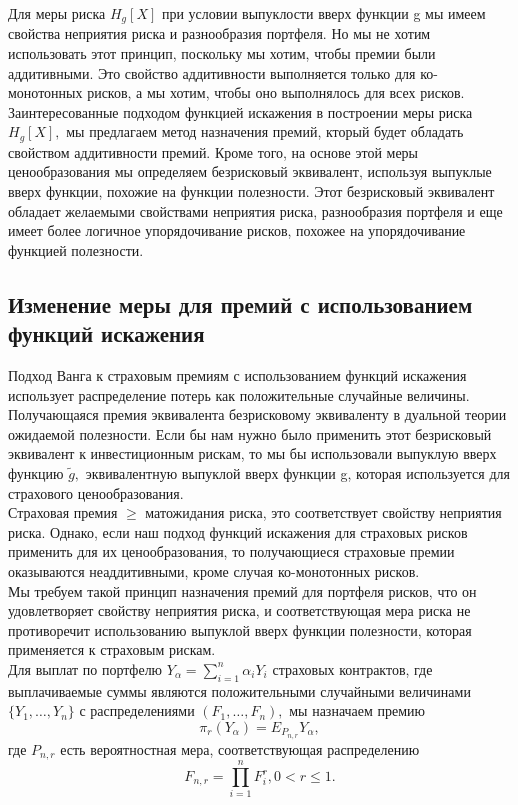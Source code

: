 \documentclass[12pt,a4paper]{article}
\begin{document}
 Для меры риска   $ H_{g} \left[ X \right]  $ при условии выпуклости вверх функции g мы имеем свойства неприятия риска и разнообразия портфеля. Но мы не хотим использовать этот принцип, поскольку мы хотим, чтобы премии были аддитивными. Это свойство аддитивности выполняется только для ко-монотонных рисков, а мы хотим, чтобы оно выполнялось для всех рисков. \\
 
Заинтересованные подходом функцией искажения  в построении  меры риска $ H_{g} \left[ X \right]  ,$ мы предлагаем метод назначения премий, кторый будет обладать свойством аддитивности премий. Кроме того, на основе этой меры ценообразования мы определяем безрисковый эквивалент, используя выпуклые вверх функции, похожие на функции полезности. Этот безрисковый эквивалент обладает желаемыми свойствами неприятия риска, разнообразия портфеля и еще имеет более логичное упорядочивание рисков, похожее на упорядочивание функцией полезности.


\subsection { Изменение меры для премий с использованием функций искажения }

Подход  Ванга к страховым премиям  с использованием функций искажения  использует распределение потерь как положительные случайные величины. Получающаяся премия эквивалента безрисковому эквиваленту в дуальной теории ожидаемой полезности.  Если бы нам нужно было применить этот безрисковый эквивалент к инвестиционным рискам, то мы бы использовали выпуклую вверх функцию $\tilde g,$  эквивалентную выпуклой вверх функции g, которая используется для страхового ценообразования.\\

Страховая премия $\geq$ матожидания риска, это соответствует свойству неприятия риска. Однако, если наш подход  функций искажения  для страховых рисков применить для их ценообразования, то получающиеся страховые премии оказываются неаддитивными, кроме случая ко-монотонных рисков.\\

Мы требуем такой принцип назначения премий для портфеля рисков, что он удовлетворяет свойству неприятия риска, и соответствующая мера риска не противоречит использованию выпуклой вверх функции полезности, которая применяется к страховым рискам.\\

Для выплат по портфелю $Y_\alpha = \sum\limits_{i=1}^{n} \alpha_i Y_i $ страховых контрактов, где выплачиваемые суммы являются положительными случайными величинами $\{ Y_1, \dots, Y_n \}$ с распределениями $(F_1, \dots, F_n),$ мы назначаем премию 
$$\pi_{r}(Y_\alpha) = E_{P_{n, r}}Y_{\alpha},$$ 
где $P_{n,r} $ есть вероятностная мера, соответствующая распределению
$$ F_{n,r} = \prod_{i=1}^{n} F_{i}^{r}, 0 < r \leq 1.$$
\end{document}
